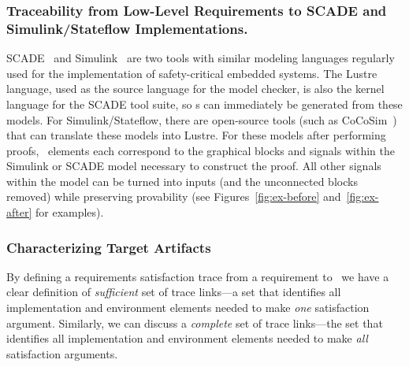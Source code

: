 \subsubsection{Traceability from Low-Level Requirements to SCADE and Simulink/Stateflow Implementations.}
SCADE~\cite{Scade} and Simulink~\cite{Simulink:Website} are two tools with similar modeling languages regularly used for the implementation of safety-critical embedded systems.  The Lustre language, used as the source language for the \jkind model checker, is also the kernel language for the SCADE tool suite, so \mivc s can immediately be generated from these models.  For Simulink/Stateflow, there are open-source tools (such as CoCoSim~\cite{LPAR-21:Automated_analysis_of_Stateflow}) that can translate these models into Lustre.
For these models after performing proofs, \mivc\ elements each correspond to the graphical blocks and signals within the Simulink or SCADE model necessary to construct the proof.  All other signals within the model can be turned into inputs (and the unconnected blocks removed) while preserving provability (see Figures~\ref{fig:ex-before} and~\ref{fig:ex-after} for examples).




\subsubsection{Characterizing Target Artifacts}

By defining a requirements satisfaction trace from a requirement to \mivcs\ we have a clear definition of \emph{sufficient} set of trace links---a set that identifies all implementation and environment elements needed to make \emph{one} satisfaction argument. Similarly, we can discuss a \emph{complete} set of trace links---the set that identifies all implementation and environment elements needed to make \emph{all} satisfaction arguments.

